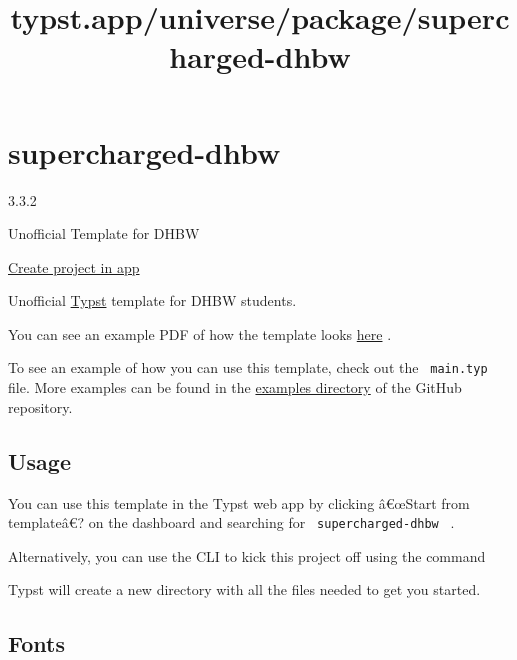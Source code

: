 \title{typst.app/universe/package/supercharged-dhbw}

\label{banner}
\label{template-thumbnail}

\section{supercharged-dhbw}\label{supercharged-dhbw}

{ 3.3.2 }

Unofficial Template for DHBW

\href{/app?template=supercharged-dhbw&version=3.3.2}{Create project in
app}

\label{readme}
Unofficial \href{https://typst.app/}{Typst} template for DHBW students.

You can see an example PDF of how the template looks
\href{https://github.com/DannySeidel/typst-dhbw-template/blob/main/examples/example.pdf}{here}
.

To see an example of how you can use this template, check out the
\texttt{\ main.typ\ } file. More examples can be found in the
\href{https://github.com/DannySeidel/typst-dhbw-template/blob/main/examples}{examples
directory} of the GitHub repository.

\subsection{Usage}\label{usage}

You can use this template in the Typst web app by clicking â€œStart from
templateâ€? on the dashboard and searching for
\texttt{\ supercharged-dhbw\ } .

Alternatively, you can use the CLI to kick this project off using the
command

\begin{Shaded}
\begin{Highlighting}[]
\end{Highlighting}
\end{Shaded}

Typst will create a new directory with all the files needed to get you
started.

\subsection{Fonts}\label{fonts}

